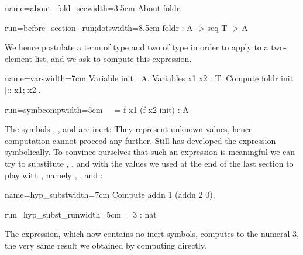 \begin{coq-left}{name=about_fold_sec}{width=3.5cm}
About foldr.
\end{coq-left}
\begin{coqout-right}{run=before_section_run;dots}{width=8.5cm}
foldr : A -> seq T -> A
\end{coqout-right}

We hence postulate a term of type  and two of type 
in order to apply  to a two-element list,
and we ask \Coq{} to compute this
expression.

\begin{coq-left}{name=vars}{width=7cm}
Variable init : A.
Variables x1 x2 : T.
Compute foldr init [:: x1; x2].
\end{coq-left}
\begin{coqout-right}{run=symbcomp}{width=5cm}
$~$
$~$
 = f x1 (f x2 init) : A
\end{coqout-right}

The symbols , ,  and  are inert:
They represent unknown values, hence computation cannot
proceed any further.  Still
\Coq{} has developed the expression symbolically.
To convince
ourselves that such an expression is meaningful
we can try to substitute , ,  and  with the
values we used at the end of the last section to
play with , namely , ,  and :

\begin{coq-left}{name=hyp_subst}{width=7cm}
Compute addn 1 (addn 2 0).
\end{coq-left}
\begin{coqout-right}{run=hyp_subst_run}{width=5cm}
 = 3 : nat
\end{coqout-right}

The expression, which now contains no inert symbols, computes to the numeral 3,
the very same result we obtained by computing 
directly.


